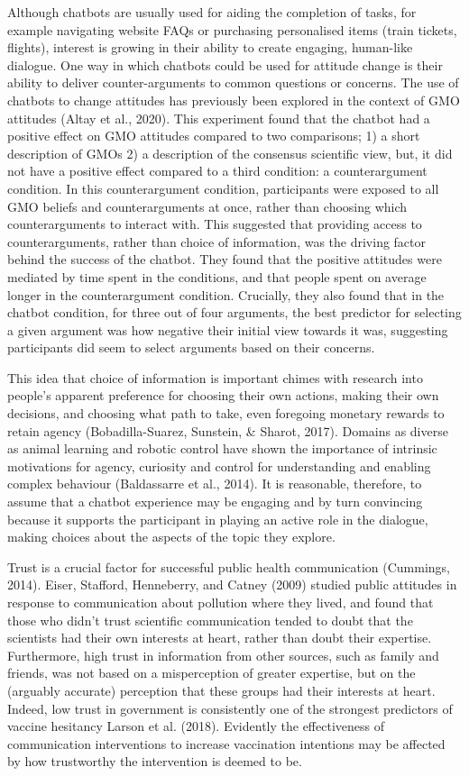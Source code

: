 \documentclass[
  english,
  ,jou,floatsintext]{apa6}
\begin{document}
Although chatbots are usually used for aiding the completion of tasks, for example navigating website FAQs or purchasing personalised items (train tickets, flights), interest is growing in their ability to create engaging, human-like dialogue. One way in which chatbots could be used for attitude change is their ability to deliver counter-arguments to common questions or concerns. The use of chatbots to change attitudes has previously been explored in the context of GMO attitudes (Altay et al., 2020). This experiment found that the chatbot had a positive effect on GMO attitudes compared to two comparisons; 1) a short description of GMOs 2) a description of the consensus scientific view, but, it did not have a positive effect compared to a third condition: a counterargument condition. In this counterargument condition, participants were exposed to all GMO beliefs and counterarguments at once, rather than choosing which counterarguments to interact with. This suggested that providing access to counterarguments, rather than choice of information, was the driving factor behind the success of the chatbot. They found that the positive attitudes were mediated by time spent in the conditions, and that people spent on average longer in the counterargument condition. Crucially, they also found that in the chatbot condition, for three out of four arguments, the best predictor for selecting a given argument was how negative their initial view towards it was, suggesting participants did seem to select arguments based on their concerns.

This idea that choice of information is important chimes with research into people's apparent preference for choosing their own actions, making their own decisions, and choosing what path to take, even foregoing monetary rewards to retain agency (Bobadilla-Suarez, Sunstein, \& Sharot, 2017). Domains as diverse as animal learning and robotic control have shown the importance of intrinsic motivations for agency, curiosity and control for understanding and enabling complex behaviour (Baldassarre et al., 2014). It is reasonable, therefore, to assume that a chatbot experience may be engaging and by turn convincing because it supports the participant in playing an active role in the dialogue, making choices about the aspects of the topic they explore.

Trust is a crucial factor for successful public health communication (Cummings, 2014). Eiser, Stafford, Henneberry, and Catney (2009) studied public attitudes in response to communication about pollution where they lived, and found that those who didn't trust scientific communication tended to doubt that the scientists had their own interests at heart, rather than doubt their expertise. Furthermore, high trust in information from other sources, such as family and friends, was not based on a misperception of greater expertise, but on the (arguably accurate) perception that these groups had their interests at heart. Indeed, low trust in government is consistently one of the strongest predictors of vaccine hesitancy Larson et al. (2018). Evidently the effectiveness of communication interventions to increase vaccination intentions may be affected by how trustworthy the intervention is deemed to be.
\end{document}
